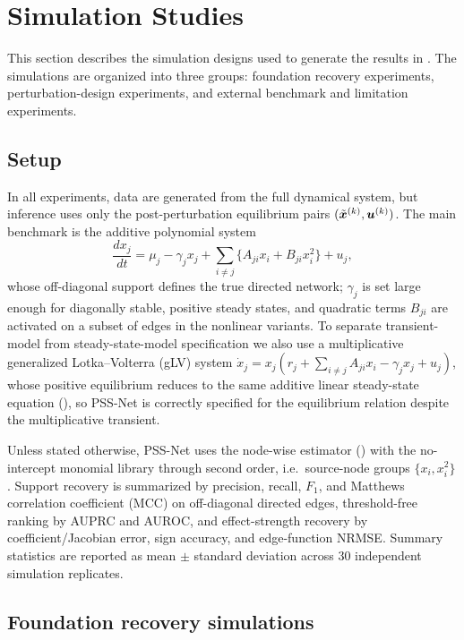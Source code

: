 \section{Simulation Studies}
\label{sec:simulation}

This section describes the simulation designs used to generate the results in
.  The simulations are organized into three groups: foundation
recovery experiments, perturbation-design experiments, and external benchmark
and limitation experiments.

\subsection{Setup}
\label{sec:sim:setup}

In all experiments, data are generated from the full dynamical system, but
inference uses only the post-perturbation equilibrium pairs
$(\tilde{\bm{x}}^{(k)},\bm{u}^{(k)})$.
The main benchmark is the additive polynomial system
\begin{equation}
  \frac{dx_j}{dt}
  =
  \mu_j - \gamma_j x_j
  + \sum_{i\neq j}\{A_{ji}x_i + B_{ji}x_i^2\}
  + u_j,
  \label{eq:sim-additive}
\end{equation}
whose off-diagonal support defines the true directed network; $\gamma_j$ is set
large enough for diagonally stable, positive steady states, and quadratic terms
$B_{ji}$ are activated on a subset of edges in the nonlinear variants.  To
separate transient-model from steady-state-model specification we also use a
multiplicative generalized Lotka--Volterra (gLV) system
$\dot x_j = x_j(r_j + \sum_{i\neq j} A_{ji}x_i - \gamma_j x_j + u_j)$, whose
positive equilibrium reduces to the same additive linear steady-state equation
(), so PSS-Net is correctly specified for the equilibrium
relation despite the multiplicative transient.

Unless stated otherwise, PSS-Net uses the node-wise \adsiht{} estimator
() with the no-intercept monomial library through second
order, i.e.\ source-node groups $\{x_i,x_i^2\}$.  Support recovery is summarized
by precision, recall, $F_1$, and Matthews correlation coefficient (MCC) on
off-diagonal directed edges, threshold-free ranking by AUPRC and AUROC, and
effect-strength recovery by coefficient/Jacobian error, sign accuracy, and
edge-function NRMSE.  Summary statistics are reported as mean $\pm$ standard
deviation across 30 independent simulation replicates.

\subsection{Foundation recovery simulations}
\label{sec:sim:foundation}

